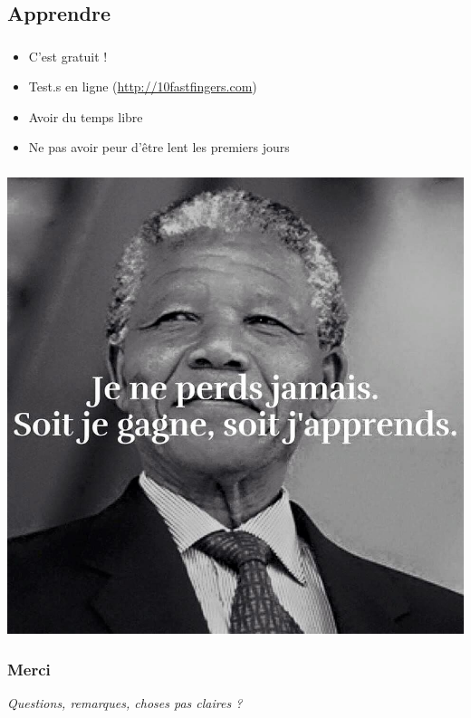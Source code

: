 \documentclass[c,12pt]{beamer}
\begin{document}
\subsection{Apprendre}

\begin{frame}
	\frametitle{\subsecname}
	\begin{itemize}
		\item<1->{C'est gratuit !}
		\item<2->{Test.s en ligne (\url{http://10fastfingers.com})}
		\item<3->{Avoir du temps libre}
		\item<4->{Ne pas avoir peur d'être lent les premiers jours}
	\end{itemize}
\end{frame}

\begin{frame}
	\frametitle{\subsecname}
	\begin{center}
		\includegraphics[scale=0.2]{mandela.jpg}
	\end{center}
\end{frame}

\begin{frame}
	\frametitle{Merci}
	\begin{center}
		\emph{Questions, remarques, choses pas claires ?}
	\end{center}
\end{frame}
\end{document}

